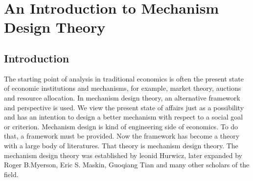 

\chapter{An Introduction to Mechanism Design Theory} %

\label{Chapter1} %


\newcommand{\keyword}[1]{\textbf{#1}}
\newcommand{\tabhead}[1]{\textbf{#1}}
\newcommand{\code}[1]{\texttt{#1}}
\newcommand{\file}[1]{\texttt{\bfseries#1}}
\newcommand{\option}[1]{\texttt{\itshape#1}}

\newtheorem{definition}{Definition}
\newtheorem*{definition*}{Definition}
\newtheorem{thm}{Theorem}
\newtheorem*{thm*}{Theorem}
\newtheorem{example}{Example}
\newtheorem*{example*}{Example}
\newtheorem{lemma}{Lemma}
\newtheorem*{lemma*}{Lemma}
\newtheorem{prop}{Proposition}
\newtheorem*{prop*}{Proposition}
\newtheorem{assumption}{Assumption}
\newtheorem*{assumption*}{Assumption}
\newtheorem{corollary}{Corollary}
\newtheorem*{corollary*}{Corollary}
\newtheorem{conjecture}{conjecture}
\newtheorem*{conjecture*}{conjecture}
\newtheorem*{remark}{Remark}





 





\section{Introduction}

The starting point of analysis in traditional economics is often the
present state of economic institutions and mechanisms, for example,
market theory, auctions and resource allocation. In mechanism design
theory, an alternative framework and perspective is used. We view the
present state of affairs just as a possibility and has an intention to
design a better mechanism with respect to a social goal or
criterion. Mechanism design is kind of engineering side of
economics. To do that, a framework must be provided. Now the framework
has become a theory with a large body of literatures. That theory is
mechanism design theory. The mechanism design theory was established
by leonid Hurwicz, later expanded by Roger B.Myerson, Eric S. Maskin,
Guoqiang Tian and many other  scholars of the field.


